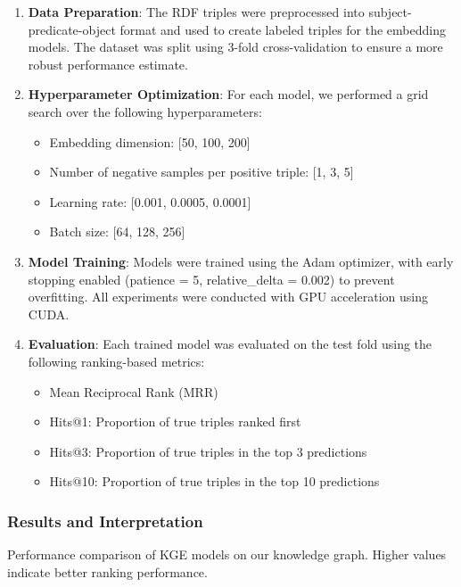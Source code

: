 \documentclass[10pt,a4paper]{article}
\begin{document}
\begin{enumerate}
    \item \textbf{Data Preparation}: The RDF triples were preprocessed into subject-predicate-object format and used to create labeled triples for the embedding models. The dataset was split using 3-fold cross-validation to ensure a more robust performance estimate.
    
    \item \textbf{Hyperparameter Optimization}: For each model, we performed a grid search over the following hyperparameters:
    \begin{itemize}
        \item Embedding dimension: [50, 100, 200]
        \item Number of negative samples per positive triple: [1, 3, 5]
        \item Learning rate: [0.001, 0.0005, 0.0001]
        \item Batch size: [64, 128, 256]
    \end{itemize}
    
    \item \textbf{Model Training}: Models were trained using the Adam optimizer, with early stopping enabled (patience = 5, relative\_delta = 0.002) to prevent overfitting. All experiments were conducted with GPU acceleration using CUDA.

    \item \textbf{Evaluation}: Each trained model was evaluated on the test fold using the following ranking-based metrics:
    \begin{itemize}
        \item Mean Reciprocal Rank (MRR)
        \item Hits@1: Proportion of true triples ranked first
        \item Hits@3: Proportion of true triples in the top 3 predictions
        \item Hits@10: Proportion of true triples in the top 10 predictions
    \end{itemize}
\end{enumerate}

\subsubsection{Results and Interpretation}

\begin{table}[H]
    \centering
    
    \caption{Performance comparison of KGE models on our knowledge graph. Higher values indicate better ranking performance.}
    \label{tab:model_comparison}
\end{table}
\end{document}
